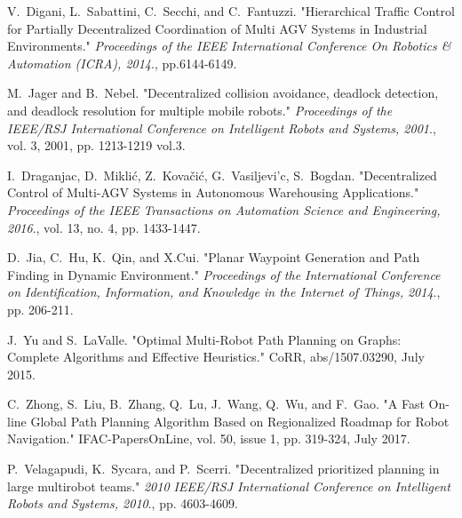 \documentclass{article}
\begin{document}


\newpage
\tableofcontents
\newpage












\begin{thebibliography}{60} %

V.~Digani, L.~Sabattini, C.~Secchi, and C.~Fantuzzi. "Hierarchical  Traffic Control for Partially Decentralized Coordination of Multi AGV Systems in Industrial Environments." \emph{Proceedings of the IEEE International Conference On Robotics \& Automation (ICRA), 2014}., pp.6144-6149.

M.~Jager and B.~Nebel. "Decentralized collision avoidance, deadlock detection, and deadlock resolution for multiple mobile robots." \emph{Proceedings of the IEEE/RSJ International Conference on Intelligent Robots and Systems, 2001}., vol. 3, 2001, pp. 1213-1219 vol.3.

I.~Draganjac, D.~Mikli{\'c}, Z.~Kova{\v c}i{\'c}, G.~Vasiljevi{'c}, S.~Bogdan. "Decentralized Control of Multi-AGV Systems in Autonomous Warehousing Applications." \emph{Proceedings of the IEEE Transactions on Automation Science and Engineering, 2016}., vol. 13, no. 4, pp. 1433-1447.

D.~Jia, C.~Hu, K.~Qin, and X.Cui. "Planar Waypoint Generation and Path Finding in Dynamic Environment." \emph{Proceedings of the International Conference on Identification, Information, and Knowledge in the Internet of Things, 2014}., pp. 206-211.

J.~Yu and S.~LaValle. "Optimal Multi-Robot Path Planning on Graphs: Complete Algorithms and Effective Heuristics." CoRR, abs/1507.03290, July 2015.

C.~Zhong, S.~Liu, B.~Zhang, Q.~Lu, J.~Wang, Q.~Wu, and F.~Gao. "A Fast On-line Global Path Planning Algorithm Based on Regionalized Roadmap for Robot Navigation." IFAC-PapersOnLine, vol. 50, issue 1, pp. 319-324, July 2017.

P.~Velagapudi, K.~Sycara, and P.~Scerri. "Decentralized prioritized planning in large multirobot teams." \emph{2010 IEEE/RSJ International Conference on Intelligent Robots and Systems, 2010}., pp. 4603-4609.


\end{thebibliography}
\end{document}
